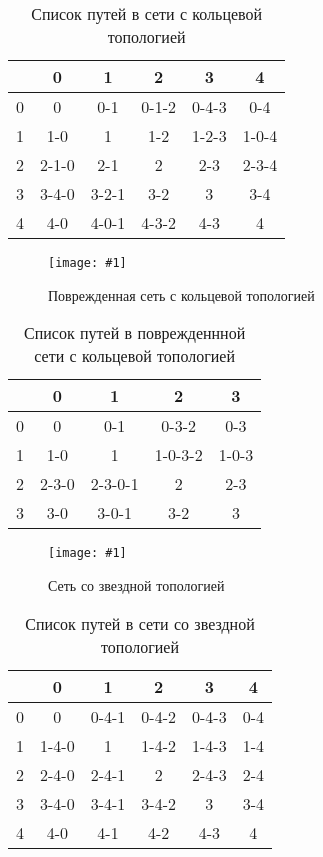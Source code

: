 \documentclass[a4paper,12pt]{article}
\newcommand{\plot}[3]{
    \begin{figure}[H]
        \begin{center}
            \texttt{[image: \#1]}
            \caption{#2}
            \label{#3}
        \end{center}
    \end{figure}
}
\begin{document}
    \begin{table}[H]
    \caption{Список путей в сети с кольцевой топологией}
        \begin{tabular}{| c | c | c | c | c | c |}
            \hline
             & 0 & 1 & 2 & 3 & 4 \\
            \hline
            0 & 0 & 0-1 & 0-1-2 & 0-4-3 & 0-4 \\
            \hline
            1 & 1-0 & 1 & 1-2 & 1-2-3 & 1-0-4 \\
            \hline
            2 & 2-1-0 & 2-1 & 2 & 2-3 & 2-3-4 \\
            \hline
            3 & 3-4-0 & 3-2-1 & 3-2 & 3 & 3-4 \\
            \hline
            4 & 4-0 & 4-0-1 & 4-3-2 & 4-3 & 4 \\
            \hline
        \end{tabular}
        \centering
    \end{table}

    \plot{img/TopologyRing corrupted.png}{Поврежденная сеть с кольцевой топологией}{p:rl_c}

    \begin{table}[H]
    \caption{Список путей в поврежденнной сети с кольцевой топологией}
        \begin{tabular}{| c | c | c | c | c |}
            \hline
             & 0 & 1 & 2 & 3 \\
            \hline
            0 & 0 & 0-1 & 0-3-2 & 0-3 \\
            \hline
            1 & 1-0 & 1 & 1-0-3-2 & 1-0-3 \\
            \hline
            2 & 2-3-0 & 2-3-0-1 & 2 & 2-3 \\
            \hline
            3 & 3-0 & 3-0-1 & 3-2 & 3 \\
            \hline
        \end{tabular}
        \centering
    \end{table}

    \plot{img/TopologyStar.png}{Сеть со звездной топологией}{p:sl}

    \begin{table}[H]
    \caption{Список путей в сети со звездной топологией}
        \begin{tabular}{| c | c | c | c | c | c |}
            \hline
             & 0 & 1 & 2 & 3 & 4 \\
            \hline
            0 & 0 & 0-4-1 & 0-4-2 & 0-4-3 & 0-4 \\
            \hline
            1 & 1-4-0 & 1 & 1-4-2 & 1-4-3 & 1-4 \\
            \hline
            2 & 2-4-0 & 2-4-1 & 2 & 2-4-3 & 2-4 \\
            \hline
            3 & 3-4-0 & 3-4-1 & 3-4-2 & 3 & 3-4 \\
            \hline
            4 & 4-0 & 4-1 & 4-2 & 4-3 & 4 \\
            \hline
        \end{tabular}
        \centering
    \end{table}
    
\end{document}
